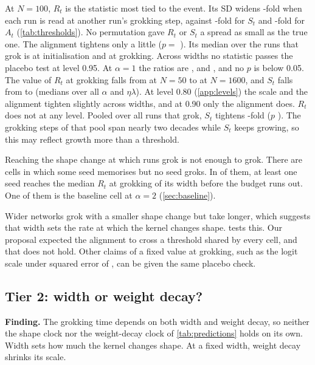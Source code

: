 \documentclass[a4paper,11pt]{article} %
\begin{document}
At $N=100$, $R_t$ is the statistic most tied to the event. Its SD widens
\EthreeNhundredRRatio-fold when each run is read at another run's grokking step,
against \EthreeNhundredSRatio-fold for $S_t$ and \EthreeNhundredARatio-fold for
$A_t$ (\cref{tab:thresholds}). No permutation gave $R_t$ or $S_t$ a spread as
small as the true one. The alignment tightens only a little ($p=$
\EthreeNhundredAP). Its median over the runs that grok is \NsixAzero{} at
initialisation and \NsixAgrok{} at grokking. Across widths no statistic passes
the placebo test at level 0.95. At $\alpha=1$ the ratios are \EthreeAoneSRatio,
\EthreeAoneRRatio{} and \EthreeAoneARatio, and no $p$ is below 0.05.
The value of $R_t$
at grokking falls from \NsevenRWFifty{} at $N=50$ to
\NsevenRWSixteenhundred{} at
$N=1600$, and $S_t$ falls from \NsevenSWFifty{} to \NsevenSWSixteenhundred{}
(medians over all $\alpha$ and $\eta\lambda$). At level 0.80
(\cref{app:levels}) the scale and the alignment tighten slightly across widths,
and at 0.90 only the alignment does. $R_t$ does not at any level.
Pooled over all \EthreeAllRuns{} runs that grok,
$S_t$ tightens \EthreeAllSRatio-fold ($p$ \EthreeAllSP). The grokking steps of
that pool span nearly two decades while $S_t$ keeps growing, so this may reflect
growth more than a threshold.

Reaching the shape change at which runs grok is not enough to grok. There are
\NeightNoGrokMemorised{} cells in which some seed memorises but no seed groks.
In \NeightAboveRMedianMemorised{} of them, at least one seed reaches the median
$R_t$ at grokking of its width before the budget runs out. One of them is the
baseline cell at $\alpha=2$ (\cref{sec:baseline}).

Wider networks grok with a smaller shape change but take longer, which suggests
that width sets the rate at which the kernel changes shape. 
tests this.
Our proposal expected the alignment to cross a threshold shared by every cell,
and that does not hold. Other claims of a fixed value at grokking, such as the
logit scale under squared error of \citet{khanhWhatDoesWeight2026}, can be
given the same placebo check.

\subsection{Tier 2: width or weight decay?}\label{sec:tier2}

\textbf{Finding.} The grokking time depends on both width and weight decay, so
neither the shape clock nor the weight-decay clock of
\cref{tab:predictions} holds on its own. Width sets how much the kernel changes
shape. At a fixed width, weight decay shrinks its scale.
\end{document}
